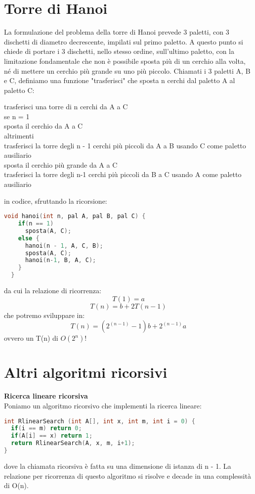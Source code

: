 \documentclass[a4paper,12pt]{article}
\begin{document}
\section{Torre di Hanoi}
La formulazione del problema della torre di Hanoi prevede 3 paletti, con 3 dischetti di diametro decrescente,
impilati sul primo paletto. A questo punto si chiede di portare i 3 dischetti, nello stesso ordine, sull'ultimo
paletto, con la limitazione fondamentale che non è possibile sposta più di un cerchio alla volta, né di mettere 
un cerchio più grande su uno più piccolo. Chiamati i 3 paletti A, B e C, definiamo una funzione "trasferisci" 
che sposta n cerchi dal paletto A al paletto C:
\par\smallskip
\begin{center}
  trasferisci una torre di n cerchi da A a C {\\
    se n = 1\\
      sposta il cerchio da A a C\\
    altrimenti {\\
      trasferisci la torre degli n - 1 cerchi più piccoli da A a B usando C come paletto ausiliario\\
      sposta il cerchio più grande da A a C\\
      trasferisci la torre degli n-1 cerchi più piccoli da B a C usando A come paletto ausiliario\\
    }
  }
\end{center}
in codice, sfruttando la ricorsione:
\begin{lstlisting}[language=C++]
  void hanoi(int n, pal A, pal B, pal C) {
    if(n == 1)
      sposta(A, C);
    else {
      hanoi(n - 1, A, C, B);
      sposta(A, C);
      hanoi(n-1, B, A, C);
    }
  }
\end{lstlisting}
da cui la relazione di ricorrenza:
$$ T(1) = a $$
$$ T(n) = b + 2T(n - 1) $$
che potremo sviluppare in:
$$ T(n) = (2^{(n-1)}-1)b + 2^{(n-1)}a $$
ovvero un T(n) di $O(2^n)$!

\section{Altri algoritmi ricorsivi}
\textbf{Ricerca lineare ricorsiva} \\
Poniamo un algoritmo ricorsivo che implementi la ricerca lineare:
\begin{lstlisting}[language=C++]
int RlinearSearch (int A[], int x, int m, int i = 0) {
  if(i == m) return 0;
  if(A[i] == x) return 1;
  return RlinearSearch(A, x, m, i+1);
}
\end{lstlisting}
dove la chiamata ricorsiva è fatta su una dimensione di istanza di n - 1. La relazione per ricorrenza 
di questo algoritmo si risolve e decade in una complessità di O(n).
\end{document}
